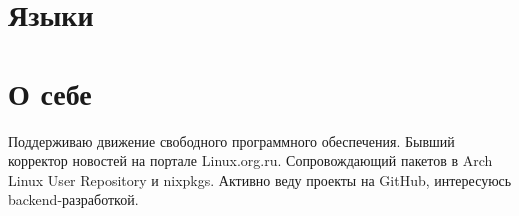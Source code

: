 \section{Языки}

\section{О себе}

Поддерживаю движение свободного программного обеспечения. Бывший корректор новостей на
портале Linux.org.ru. Сопровождающий пакетов в Arch Linux User Repository и nixpkgs.
Активно веду проекты на GitHub, интересуюсь backend-разработкой.
